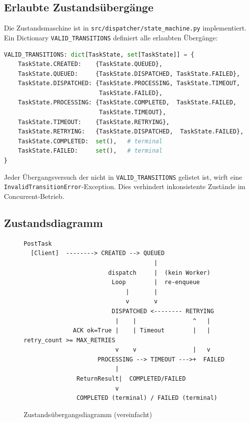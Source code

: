 \subsection{Erlaubte Zustandsübergänge}

Die Zustandsmaschine ist in \texttt{src/dispatcher/state\_machine.py}
implementiert. Ein Dictionary \texttt{VALID\_TRANSITIONS} definiert
alle erlaubten Übergänge:

\begin{lstlisting}[language=Python,caption={Erlaubte Zustandsübergänge (state\_machine.py)}]
VALID_TRANSITIONS: dict[TaskState, set[TaskState]] = {
    TaskState.CREATED:    {TaskState.QUEUED},
    TaskState.QUEUED:     {TaskState.DISPATCHED, TaskState.FAILED},
    TaskState.DISPATCHED: {TaskState.PROCESSING, TaskState.TIMEOUT,
                           TaskState.FAILED},
    TaskState.PROCESSING: {TaskState.COMPLETED,  TaskState.FAILED,
                           TaskState.TIMEOUT},
    TaskState.TIMEOUT:    {TaskState.RETRYING},
    TaskState.RETRYING:   {TaskState.DISPATCHED,  TaskState.FAILED},
    TaskState.COMPLETED:  set(),   # terminal
    TaskState.FAILED:     set(),   # terminal
}
\end{lstlisting}

\noindent Jeder Übergangsversuch der nicht in \texttt{VALID\_TRANSITIONS} gelistet ist,
wirft eine \\
\texttt{InvalidTransitionError}-Exception.
Dies verhindert inkonsistente Zustände im Concurrent-Betrieb.

\subsection{Zustandsdiagramm}

\begin{figure}[H]
\centering
\begin{lstlisting}[language={},frame=single,basicstyle=\ttfamily\small]
                    PostTask
  [Client]  --------> CREATED --> QUEUED
                                     |
                        dispatch     |  (kein Worker)
                         Loop        |  re-enqueue
                             |       |
                             v       v
                         DISPATCHED <-------- RETRYING
                          |    |                ^   |
              ACK ok=True |    | Timeout        |   | retry_count >= MAX_RETRIES
                          v    v                |   v
                     PROCESSING --> TIMEOUT --->+  FAILED
                          |
               ReturnResult|  COMPLETED/FAILED
                          v
               COMPLETED (terminal) / FAILED (terminal)
\end{lstlisting}
\caption{Zustandsübergangsdiagramm (vereinfacht)}
\end{figure}

